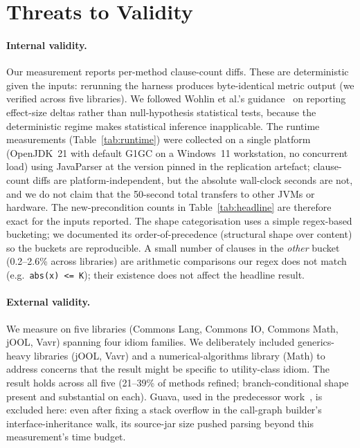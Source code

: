 \section{Threats to Validity}
\label{sec:threats}

\paragraph{Internal validity.}
Our measurement reports per-method clause-count diffs. These are deterministic given the inputs: rerunning the harness produces byte-identical metric output (we verified across five libraries). We followed Wohlin et al.'s guidance~\cite{wohlin2012experimentation} on reporting effect-size deltas rather than null-hypothesis statistical tests, because the deterministic regime makes statistical inference inapplicable. The runtime measurements (Table~\ref{tab:runtime}) were collected on a single platform (OpenJDK~21 with default G1GC on a Windows~11 workstation, no concurrent load) using JavaParser at the version pinned in the replication artefact; clause-count diffs are platform-independent, but the absolute wall-clock seconds are not, and we do not claim that the 50-second total transfers to other JVMs or hardware.
The new-precondition counts in Table~\ref{tab:headline} are
therefore exact for the inputs reported. The shape categorisation
uses a simple regex-based bucketing; we documented its
order-of-precedence (structural shape over content) so the buckets
are reproducible. A small number of clauses in the \emph{other}
bucket (0.2--2.6\% across libraries) are arithmetic comparisons our
regex does not match (e.g.\ \texttt{abs(x) <= K}); their existence
does not affect the headline result.

\paragraph{External validity.}
We measure on five libraries (Commons Lang, Commons IO,
Commons Math, jOOL, Vavr) spanning four idiom families. We
deliberately included generics-heavy libraries (jOOL, Vavr) and a
numerical-algorithms library (Math) to address concerns that the
result might be specific to utility-class idiom. The result holds
across all five (21--39\% of methods refined; branch-conditional
shape present and substantial on each). Guava, used in the
predecessor work~\cite{edmonds2026inference}, is excluded here: even
after fixing a stack overflow in the call-graph builder's
interface-inheritance walk, its source-jar size pushed parsing beyond
this measurement's time budget.

